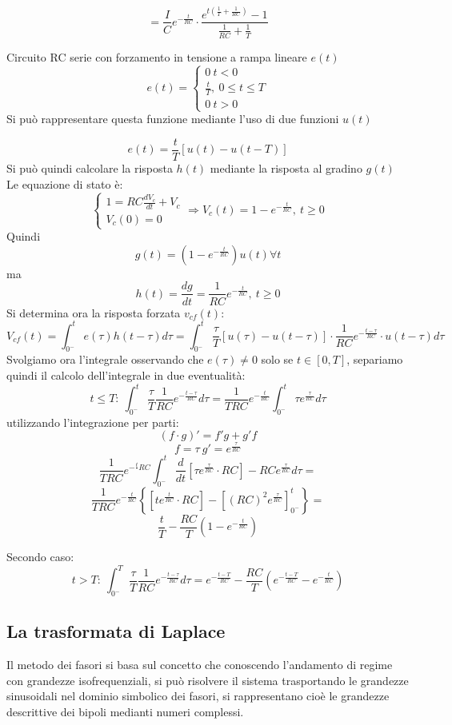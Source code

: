 $$
= \frac{I}{C} e^{-\frac{t}{RC}}\cdot \frac{e^{t\left(\frac{1}{T}+\frac{1}{RC}\right)}-1}{\frac{1}{RC}+\frac{1}{T}}
$$

Circuito RC serie con forzamento in tensione a rampa lineare $e(t)$
$$
e(t) = \begin{cases}
0\ t<0 \\
\frac{t}{T},\ 0\leq t\leq T\\
0\ t>0
\end{cases}
$$
Si può rappresentare questa funzione mediante l'uso di due funzioni $u(t)$

$$
e(t) = \frac{t}{T}\left[u(t) - u(t-T)\right]
$$
Si può quindi calcolare la risposta $h(t)$ mediante la risposta al gradino $g(t)$
Le equazione di stato è:
$$
\begin{cases}
1 = RC\frac{dV_c}{dt} + V_c \\
V_c(0) = 0 
\end{cases}
\Rightarrow V_c(t) = 1 - e^{-\frac{t}{RC}},\ t\geq 0$$
Quindi 
$$
g(t) = (1 - e^{-\frac{t}{RC}})u(t) \forall t
$$
ma
$$
h(t) = \frac{dg}{dt} = \frac{1}{RC}e^{-\frac{t}{RC}},\ t\geq 0
$$
Si determina ora la risposta forzata $v_{cf}(t)$:
$$
V_{cf}(t) = \int_{0^-}^{t} e(\tau) h(t-\tau)d\tau = \int_{0^-}^{t}\frac{\tau}{T}\left[u(\tau) - u(t-\tau)\right]
\cdot \frac{1}{RC} e ^{-\frac{t-\tau}{RC}}\cdot u(t-\tau)d\tau
$$
Svolgiamo ora l'integrale osservando che $e(\tau) \neq 0 $ solo se $t \in [0,T]$, separiamo quindi
il calcolo dell'integrale in due eventualità:
$$
t\leq T:\ \int_{0^-}^{t}\frac{\tau}{T}\frac{1}{RC}e^{-\frac{t-\tau}{RC}}d\tau = \frac{1}{TRC}e^{-\frac{t}{RC}}\int_{0^-}^{t}\tau e^{\frac{\tau}{RC}}d\tau 
$$
utilizzando l'integrazione per parti:
$$
\left(f\cdot g\right)' = f'g + g'f
$$
$$
f = \tau\ g' = e^{\frac{\tau}{RC}}
$$
$$
\frac{1}{TRC}e^{-\frac{t}{}RC}\int_{0^-}^{t}\frac{d}{dt}\left[\tau e^{\frac{\tau}{RC}}\cdot RC \right] -
RC e^{\frac{\tau}{RC}} d\tau =
$$
$$
\frac{1}{TRC} e^{-\frac{t}{RC}} \left\{ \left[t e^{\frac{t}{RC}}\cdot RC \right] - \left[(RC)^2 e^{\frac{\tau}{RC}} \right]_{0^-}^{t}  \right\} =
$$
$$
\frac{t}{T} - \frac{RC}{T}\left(1-e^{-\frac{t}{RC}}\right)
$$

Secondo caso:
$$
t > T:\ \int_{0^-}^{T} \frac{\tau}{T}\frac{1}{RC} e^{-\frac{t-\tau}{RC}}d\tau =  e^{-\frac{t-T}{RC}}-\frac{RC}{T}\left(e^{-\frac{t-T}{RC}} -e^{-\frac{t}{RC}} \right)
$$

\subsection{La trasformata di Laplace}
Il metodo dei fasori si basa sul concetto che conoscendo l'andamento di regime con grandezze isofrequenziali, si può risolvere il sistema trasportando le grandezze sinusoidali nel dominio simbolico
dei fasori, si rappresentano cioè le grandezze descrittive dei bipoli medianti numeri complessi.


